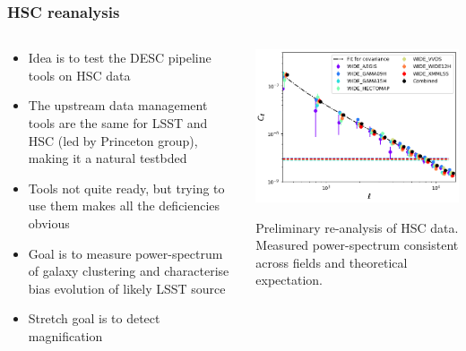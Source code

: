 \documentclass[aspectratio=169]{beamer}
\begin{document}
\begin{frame}
  \frametitle{HSC reanalysis}

  \begin{columns}
    \begin{column}{7cm}
      \begin{itemize}
      \item Idea is to test the DESC pipeline tools on HSC data
      \item The upstream data management tools are the same for LSST
        and HSC (led by Princeton group), making it a natural testbded

      \item Tools not quite ready, but trying to use them makes all
        the deficiencies obvious
      \item Goal is to measure power-spectrum of galaxy clustering and
        characterise bias evolution of likely LSST source
      \item Stretch goal is to detect magnification
      \end{itemize}
    \end{column}
    \begin{column}{6cm}
      \includegraphics[width=\linewidth]{./cls_hsc_new.png}
      \begin{center}
        \scriptsize Preliminary re-analysis of HSC data. Measured
        power-spectrum consistent across fields and theoretical expectation.
      \end{center}

    \end{column}
  \end{columns}


\end{frame}
\end{document}
